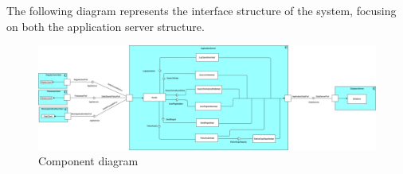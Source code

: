 The following diagram represents the interface structure of the system, focusing on both the application server structure. \newline
\begin{figure}[h!]
	\centering
	\includegraphics[width=\textwidth]{Images/component_diagram_beta}
	\caption{Component diagram}
\end{figure}

